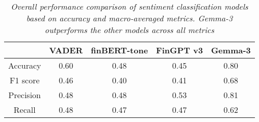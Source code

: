 \begin{table}[h]
    \centering
    \begin{tabular}{|c|c|c|c|c|}
        \hline
        & VADER & finBERT-tone & FinGPT v3 & Gemma-3  \\ \hline
        Accuracy &  0.60 & 0.48 & 0.45 & 0.80\\ \hline
        F1 score & 0.46 & 0.40 & 0.41 & 0.68\\ \hline
        Precision & 0.48 & 0.48 & 0.53 & 0.81 \\ \hline
        Recall & 0.48 & 0.47 & 0.47 & 0.62 \\ \hline
    \end{tabular}
    \caption{\textit{Overall performance comparison of sentiment classification models based on accuracy and macro-averaged metrics. Gemma-3 outperforms the other models across all metrics}}
    \label{tab:placeholder_label}
\end{table}